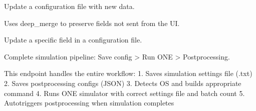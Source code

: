 \documentclass[a4paper,11pt,english,openany,oneside]{sphinxmanual}
\begin{document}

\begin{fulllineitems}
\label{\detokenize{modules/api:app.api.update_config}}
\pysigstartsignatures
\pysiglinewithargsret
{}
{}
{}
\pysigstopsignatures
\sphinxAtStartPar
Update a configuration file with new data.

\sphinxAtStartPar
Uses deep\_merge to preserve fields not sent from the UI.

\end{fulllineitems}


\begin{fulllineitems}
\label{\detokenize{modules/api:app.api.update_config_field}}
\pysigstartsignatures
\pysiglinewithargsret
{}
{}
{}
\pysigstopsignatures
\sphinxAtStartPar
Update a specific field in a configuration file.

\end{fulllineitems}


\begin{fulllineitems}
\label{\detokenize{modules/api:app.api.run_one_simulator}}
\pysigstartsignatures
\pysiglinewithargsret
{}
{}
{}
\pysigstopsignatures
\sphinxAtStartPar
Complete simulation pipeline: Save config \sphinxhyphen{}> Run ONE \sphinxhyphen{}> Post\sphinxhyphen{}processing.

\sphinxAtStartPar
This endpoint handles the entire workflow:
1. Saves simulation settings file (.txt)
2. Saves post\sphinxhyphen{}processing configs (JSON)
3. Detects OS and builds appropriate command
4. Runs ONE simulator with correct settings file and batch count
5. Auto\sphinxhyphen{}triggers post\sphinxhyphen{}processing when simulation completes

\end{fulllineitems}
\end{document}
